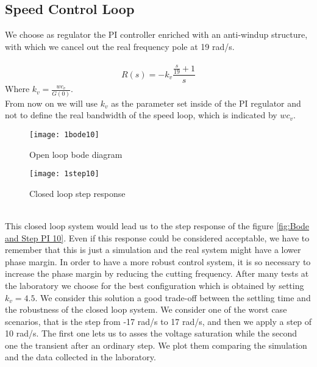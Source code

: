 \newpage
\subsection{Speed Control Loop}
We choose as regulator the PI controller enriched with an anti-windup structure, with which we cancel out the real frequency pole at 19 rad/s. \\
\\
\[
R(s)=-k_v
\frac{\frac{s}{19}+1}{s}
\]
\newline
Where $k_{v}=\frac{wc_{v}}{G(0)}$.
\\
 From now on we will use $k_v$ as the parameter set inside of the PI regulator and not to define the real bandwidth of the speed loop, which is indicated by $wc_v$.
\\
\begin{figure*}[h]
	\centering
	\begin{subfigure}{0.45\columnwidth}
		\texttt{[image: 1bode10]}
		\caption{Open loop bode diagram}
	\end{subfigure}
	\begin{subfigure}{0.45\columnwidth}
		\texttt{[image: 1step10]}
		\caption{Closed loop step response}
	\end{subfigure}
	\caption{Speed control loop with  $wc_{v} $=10 rad/s}
	\label{fig:Bode and Step PI 10}
\end{figure*}
\\
This closed loop system would lead us to the step response of the figure \ref{fig:Bode and Step PI 10}. 
Even if this response could be considered acceptable, we have to remember that this is just a simulation and the real system might have a lower phase margin. In order to have a more robust control system, it is so necessary to increase the phase margin by reducing the cutting frequency. 
\newline After many tests at the laboratory we choose for the best configuration which is obtained by setting $k_v=4.5$. We consider this solution a good trade-off between the settling time and the robustness of the closed loop system.
We consider one of the worst case scenarios, that is the step from -17 rad/s to 17 rad/s, and then we apply a step of 10 rad/s. The first one lets us to asses the voltage saturation while the second one the transient after an ordinary step.
We plot them comparing the simulation and the data collected in the laboratory.

\newpage

